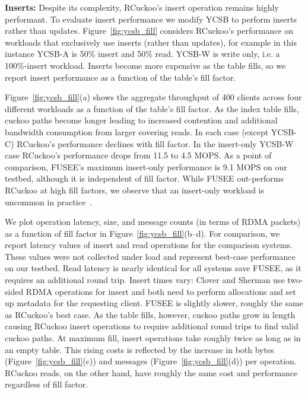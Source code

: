 \textbf{Inserts:}
Despite its complexity, RCuckoo's insert operation remains highly
performant.  To evaluate insert performance we modify YCSB to perform
inserts rather than updates.  Figure~\ref{fig:ycsb_fill} considers
RCuckoo's performance on workloads that exclusively use inserts (rather than
updates), for example in this instance YCSB-A is 50\% insert and 50\%
read. YCSB-W is write only, i.e. a 100\%-insert workload.  Inserts become
more expensive as the table fills, so we report insert performance as
a function of the table's fill factor.

Figure~\ref{fig:ycsb_fill}(a) shows the aggregate throughput
of 400 clients across four different workloads as a function
of the table's fill factor.  As the index table fills,
cuckoo paths become longer leading to increased contention
and additional bandwidth consumption from larger covering
reads. In each case (except YCSB-C) RCuckoo's performance
declines with fill factor. In the insert-only YCSB-W case
RCuckoo's performance drops from 11.5 to 4.5 MOPS.  As a
point of comparison, FUSEE's maximum insert-only performance
is 9.1 MOPS on our testbed, although it is independent of
fill factor.  While FUSEE out-performs RCuckoo at high fill
factors, we observe that an insert-only workload is uncommon
in practice~\cite{facebook-memcached}.

We plot operation latency, size, and message counts (in
terms of RDMA packets) as a function of fill factor in
Figure~\ref{fig:ycsb_fill}(b--d).  For comparison, we report
latency values of insert and read operations for the
comparison systems. These values were not collected under
load and represent best-case performance on our testbed.
Read latency is nearly identical for all systems save FUSEE,
as it requires an additional round trip.  Insert times vary:
Clover and Sherman use two-sided RDMA operations for insert
and both need to perform allocations and set up metadata for
the requesting client.  FUSEE is slightly slower, roughly
the same as RCuckoo's best case.  As the table fills,
however, cuckoo paths grow in length causing RCuckoo insert
operations to require additional round trips to find valid
cuckoo paths.  At maximum fill, insert operations take
roughly twice as long as in an empty table. This rising costs
is reflected by the increase in both bytes (Figure~\ref{fig:ycsb_fill}(c)) and messages (Figure~\ref{fig:ycsb_fill}(d)) per
operation.  RCuckoo reads, on the other hand, have roughly
the same cost and performance regardless of fill factor.


